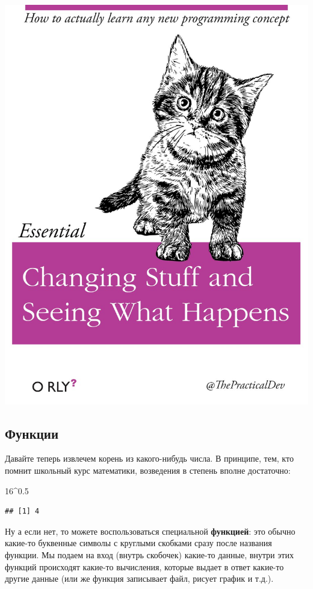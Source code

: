 \documentclass[]{book}
\newenvironment{Shaded}{\begin{snugshade}}{\end{snugshade}}
\newcommand{\DecValTok}[1]{\textcolor[rgb]{0.00,0.00,0.81}{#1}}
\newcommand{\FloatTok}[1]{\textcolor[rgb]{0.00,0.00,0.81}{#1}}
\newcommand{\OperatorTok}[1]{\textcolor[rgb]{0.81,0.36,0.00}{\textbf{#1}}}
\begin{document}
\includegraphics{images/ThePracticalDev_2016-Apr-13.jpg}

\hypertarget{func}{%
\subsection{Функции}\label{func}}

Давайте теперь извлечем корень из какого-нибудь числа. В принципе, тем, кто помнит школьный курс математики, возведения в степень вполне достаточно:

\begin{Shaded}
\begin{Highlighting}[]
\DecValTok{16}\OperatorTok{^}\FloatTok{0.5}
\end{Highlighting}
\end{Shaded}

\begin{verbatim}
## [1] 4
\end{verbatim}

Ну а если нет, то можете воспользоваться специальной \textbf{функцией}: это обычно какие-то буквенные символы с круглыми скобками сразу после названия функции. Мы подаем на вход (внутрь скобочек) какие-то данные, внутри этих функций происходят какие-то вычисления, которые выдает в ответ какие-то другие данные (или же функция записывает файл, рисует график и т.д.).
\end{document}

